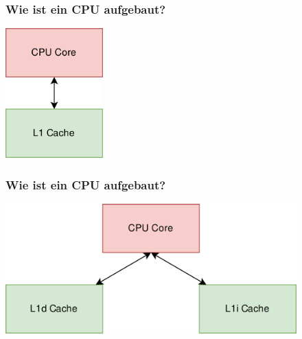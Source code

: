 \documentclass{beamer}
\begin{document}
%
%
\begin{frame}[t]
\frametitle{Wie ist ein CPU aufgebaut?}
\centering
\includegraphics[height=5cm]{CPU2.PNG}
\end{frame}

%
\begin{frame}[t]
\frametitle{Wie ist ein CPU aufgebaut?}
\centering
\includegraphics[height=5cm]{cpu3.png}
\end{frame}
\end{document}
